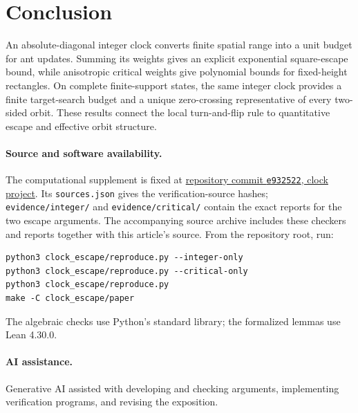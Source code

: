 \documentclass[11pt,a4paper]{article}
\theoremstyle{remark}\newtheorem{remark}[theorem]{Remark}
\begin{document}
\section{Conclusion}
An absolute-diagonal integer clock converts finite spatial range into a unit
budget for ant updates. Summing its weights gives an explicit exponential
square-escape bound, while anisotropic critical weights give polynomial
bounds for fixed-height rectangles. On complete finite-support states, the
same integer clock provides a finite target-search budget and a unique
zero-crossing representative of every two-sided orbit. These results connect
the local turn-and-flip rule to quantitative escape and effective orbit structure.

\paragraph{Source and software availability.}
The computational supplement is fixed at
\href{https://github.com/kehao95/langtons-ant-core/tree/e93252230ea9109908c23a009824d72d30fb91e2/clock_escape}{repository commit \texttt{e932522}, clock project}.
Its \texttt{sources.json} gives the verification-source hashes;
\texttt{evidence/integer/} and \texttt{evidence/critical/} contain the exact
reports for the two escape arguments. The accompanying source archive includes
these checkers and reports together with this article's source.
From the repository root, run:
\begin{verbatim}
python3 clock_escape/reproduce.py --integer-only
python3 clock_escape/reproduce.py --critical-only
python3 clock_escape/reproduce.py
make -C clock_escape/paper
\end{verbatim}
The algebraic checks use Python's standard library; the formalized lemmas use
Lean 4.30.0.

\paragraph{AI assistance.}
Generative AI assisted with developing and checking arguments, implementing
verification programs, and revising the exposition.

\appendix
\end{document}
